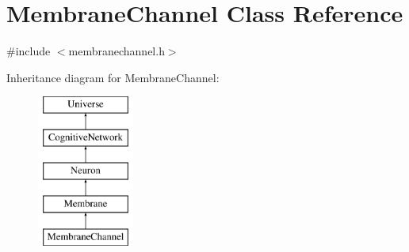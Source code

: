 \hypertarget{classMembraneChannel}{}\section{Membrane\+Channel Class Reference}
\label{classMembraneChannel}


{\ttfamily \#include $<$membranechannel.\+h$>$}

Inheritance diagram for Membrane\+Channel\+:\begin{figure}[H]
\begin{center}
\leavevmode
\includegraphics[height=5.000000cm]{classMembraneChannel}
\end{center}
\end{figure}
